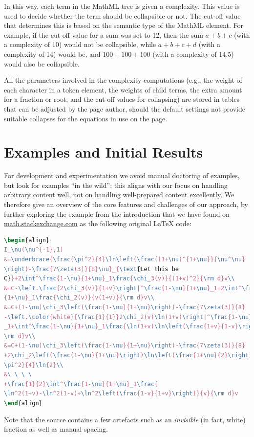 \documentclass{llncs}
\begin{document}
In this way, each term in the MathML tree is given a complexity.
This value is used to decide whether the term should be collapsible
or not.  The cut-off value that determines this is based on the
semantic type of the MathML element.  For example, if the cut-off
value for a sum was set to 12, then the sum $a+b+c$ (with a complexity
of 10) would not be collapsible, while $a+b+c+d$ (with a complexity of
14) would be, and $100+100+100$ (with a complexity of 14.5) would
also be collapsible.

All the parameters involved in the complexity computations (e.g., the
weight of each character in a token element, the weights of child
terms, the extra amount for a fraction or root, and the cut-off values
for collapsing) are stored in tables that can be adjusted by the
page author, should the default settings not provide suitable
collapses for the equations in use on the page.


\section{Examples and Initial Results}
\label{sec:results}

For development and experimentation we avoid manual doctoring of examples, but
look for examples ``in the wild''; this aligns with our focus on handling
arbitrary content well, not on handling well-prepared content excellently.  We
therefore give an overview of the core features and challenges of our approach,
by further exploring the example from the introduction that we have found on
\href{http://math.stackexchange.com/a/1285149}{math.stackexchange.com} as the
following original {\LaTeX} code:


{\tiny
\begin{lstlisting}[language=TeX]
\begin{align}
I_\nu(\nu^{-1},1)
&=\underbrace{\frac{\pi^2}{4}\ln\left(\frac{(1+\nu)^{1+\nu}}{\nu^\nu}
\right)-\frac{7\zeta(3)}{8}\nu}_{\text{Let this be 
C}}+2\int^\frac{1-\nu}{1+\nu}_1\frac{\chi_3(v)}{(1+v)^2}{\rm d}v\\
&=C-\left.\frac{2\chi_3(v)}{1+v}\right|^\frac{1-\nu}{1+\nu}_1+2\int^\frac{1-\nu}
{1+\nu}_1\frac{\chi_2(v)}{v(1+v)}{\rm d}v\\
&=C+(1-\nu)\chi_3\left(\frac{1-\nu}{1+\nu}\right)-\frac{7\zeta(3)}{8}
-\left.\color{white}{\frac{1}{1}}2\chi_2(v)\ln(1+v)\right|^\frac{1-\nu}{1+\nu}
_1+\int^\frac{1-\nu}{1+\nu}_1\frac{\ln(1+v)\ln\left(\frac{1+v}{1-v}\right)}{v}{
\rm d}v\\
&=C+(1-\nu)\chi_3\left(\frac{1-\nu}{1+\nu}\right)-\frac{7\zeta(3)}{8}
+2\chi_2\left(\frac{1-\nu}{1+\nu}\right)\ln\left(\frac{1+\nu}{2}\right)+\frac{
\pi^2}{4}\ln{2}\\
&\ \ \ \ 
+\frac{1}{2}\int^\frac{1-\nu}{1+\nu}_1\frac{
\ln^2(1+v)-\ln^2(1-v)+\ln^2\left(\frac{1-v}{1+v}\right)}{v}{\rm d}v
\end{align}
\end{lstlisting}
} Note that the source contains a few artefacts such as an \emph{invisible} (in
fact, white) fraction as well as manual spacing.
\end{document}
